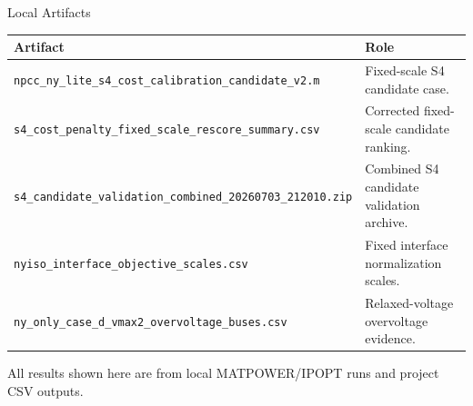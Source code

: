 \documentclass[aspectratio=169,10pt]{beamer}
\begin{document}
\begin{frame}{Local Artifacts}
\scriptsize
\begin{tabularx}{\linewidth}{l X}
\toprule
\textbf{Artifact} & \textbf{Role} \\
\midrule
\texttt{npcc\_ny\_lite\_s4\_cost\_calibration\_candidate\_v2.m} & Fixed-scale S4 candidate case. \\
\texttt{s4\_cost\_penalty\_fixed\_scale\_rescore\_summary.csv} & Corrected fixed-scale candidate ranking. \\
\texttt{s4\_candidate\_validation\_combined\_20260703\_212010.zip} & Combined S4 candidate validation archive. \\
\texttt{nyiso\_interface\_objective\_scales.csv} & Fixed interface normalization scales. \\
\texttt{ny\_only\_case\_d\_vmax2\_overvoltage\_buses.csv} & Relaxed-voltage overvoltage evidence. \\
\bottomrule
\end{tabularx}

\vspace{0.7em}
\begin{center}
\footnotesize All results shown here are from local MATPOWER/IPOPT runs and project CSV outputs.
\end{center}
\end{frame}
\end{document}
